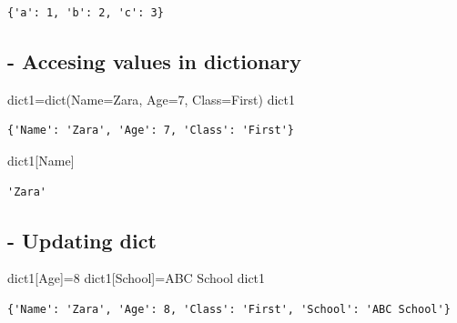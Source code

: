 \documentclass[
  letterpaper,
  DIV=11,
  numbers=noendperiod]{scrreprt}
\newenvironment{Shaded}{\begin{snugshade}}{\end{snugshade}}
\newcommand{\BuiltInTok}[1]{\textcolor[rgb]{0.00,0.23,0.31}{#1}}
\newcommand{\DecValTok}[1]{\textcolor[rgb]{0.68,0.00,0.00}{#1}}
\newcommand{\NormalTok}[1]{\textcolor[rgb]{0.00,0.23,0.31}{#1}}
\newcommand{\OperatorTok}[1]{\textcolor[rgb]{0.37,0.37,0.37}{#1}}
\newcommand{\StringTok}[1]{\textcolor[rgb]{0.13,0.47,0.30}{#1}}
\begin{document}
\begin{verbatim}
{'a': 1, 'b': 2, 'c': 3}
\end{verbatim}

\subsection{- Accesing values in
dictionary}\label{accesing-values-in-dictionary}

\begin{Shaded}
\begin{Highlighting}[]
\NormalTok{dict1}\OperatorTok{=}\BuiltInTok{dict}\NormalTok{(Name}\OperatorTok{=}\StringTok{\textquotesingle{}Zara\textquotesingle{}}\NormalTok{, Age}\OperatorTok{=}\DecValTok{7}\NormalTok{, Class}\OperatorTok{=}\StringTok{\textquotesingle{}First\textquotesingle{}}\NormalTok{)}
\NormalTok{dict1}
\end{Highlighting}
\end{Shaded}

\begin{verbatim}
{'Name': 'Zara', 'Age': 7, 'Class': 'First'}
\end{verbatim}

\begin{Shaded}
\begin{Highlighting}[]
\NormalTok{dict1[}\StringTok{\textquotesingle{}Name\textquotesingle{}}\NormalTok{]}
\end{Highlighting}
\end{Shaded}

\begin{verbatim}
'Zara'
\end{verbatim}

\subsection{- Updating dict}\label{updating-dict}

\begin{Shaded}
\begin{Highlighting}[]
\NormalTok{dict1[}\StringTok{\textquotesingle{}Age\textquotesingle{}}\NormalTok{]}\OperatorTok{=}\DecValTok{8}
\NormalTok{dict1[}\StringTok{\textquotesingle{}School\textquotesingle{}}\NormalTok{]}\OperatorTok{=}\StringTok{\textquotesingle{}ABC School\textquotesingle{}}
\NormalTok{dict1}
\end{Highlighting}
\end{Shaded}

\begin{verbatim}
{'Name': 'Zara', 'Age': 8, 'Class': 'First', 'School': 'ABC School'}
\end{verbatim}
\end{document}

